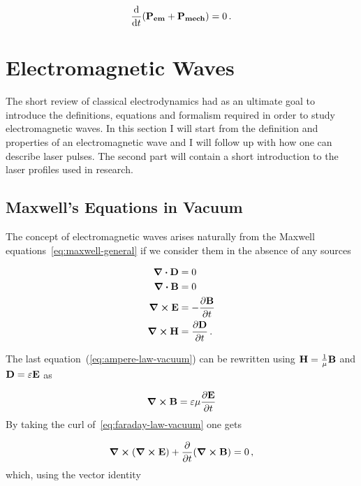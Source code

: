 \documentclass[12pt, class=report, crop=false]{standalone}
\begin{document}
\begin{equation}
  \dv{t} (\vb{P_{em}}+\vb{P_{mech}}) = 0 \,.
\end{equation}

\section{Electromagnetic Waves}
The short review of classical electrodynamics had as an ultimate goal to introduce the definitions, equations and formalism required in order to study electromagnetic waves. In this section I will start from the definition and properties of an electromagnetic wave and I will follow up with how one can describe laser pulses. The second part will contain a short introduction to the laser profiles used in research.

\subsection{Maxwell's Equations in Vacuum}
The concept of electromagnetic waves arises naturally from the Maxwell equations~\cref{eq:maxwell-general} if we consider them in the absence of any sources

\begin{subequations}
  \label{eq:maxwell-vacuum}
  \begin{align}
    \div{\vb{D}} & = 0
    \label{eq:coulomb-law-vacuum} \\
    \div{\vb{B}} & = 0
    \label{eq:gauss-law-vacuum} \\
    \curl{\vb{E}} & = - \pdv{\vb{B}}{t}
    \label{eq:faraday-law-vacuum} \\
    \curl{\vb{H}} & = \pdv{\vb{D}}{t}
    \label{eq:ampere-law-vacuum} \,.
  \end{align}
\end{subequations}

The last equation~(\ref{eq:ampere-law-vacuum}) can be rewritten using \(\vb{H}=\frac{1}{\mu} \vb{B}\) and \(\vb{D} = \varepsilon \vb{E}\) as

\begin{equation}
  \curl{\vb{B}} = \varepsilon \mu \pdv{\vb{E}}{t}
\end{equation}
By taking the curl of~\cref{eq:faraday-law-vacuum} one gets

\begin{equation*}
  \curl{(\curl{\vb{E}})} + \pdv{t} (\curl{\vb{B}}) = 0\,,
\end{equation*}
which, using the vector identity
\end{document}
